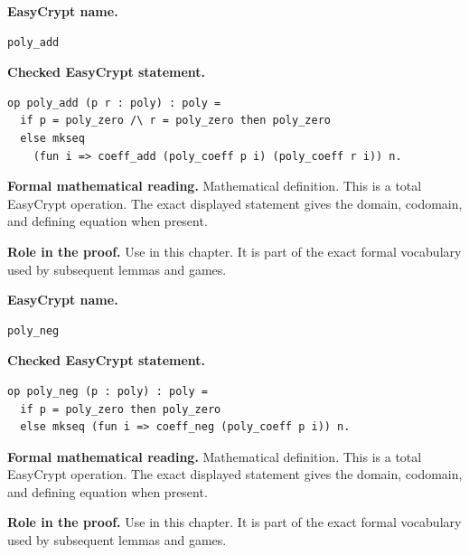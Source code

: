 \begin{formaldefinition}
\noindent\textbf{EasyCrypt name.}
\begin{lstlisting}[language=EasyCrypt,basicstyle=\ttfamily\scriptsize]
poly_add
\end{lstlisting}
\noindent\textbf{Checked EasyCrypt statement.}
\begin{lstlisting}[language=EasyCrypt,basicstyle=\ttfamily\scriptsize]
op poly_add (p r : poly) : poly =
  if p = poly_zero /\ r = poly_zero then poly_zero
  else mkseq
    (fun i => coeff_add (poly_coeff p i) (poly_coeff r i)) n.
\end{lstlisting}
\noindent\textbf{Formal mathematical reading.}
Mathematical definition. This is a total EasyCrypt operation.  The exact displayed statement gives the domain, codomain, and defining equation when present.

\noindent\textbf{Role in the proof.}
Use in this chapter. It is part of the exact formal vocabulary used by subsequent lemmas and games.

\end{formaldefinition}

\begin{formaldefinition}
\noindent\textbf{EasyCrypt name.}
\begin{lstlisting}[language=EasyCrypt,basicstyle=\ttfamily\scriptsize]
poly_neg
\end{lstlisting}
\noindent\textbf{Checked EasyCrypt statement.}
\begin{lstlisting}[language=EasyCrypt,basicstyle=\ttfamily\scriptsize]
op poly_neg (p : poly) : poly =
  if p = poly_zero then poly_zero
  else mkseq (fun i => coeff_neg (poly_coeff p i)) n.
\end{lstlisting}
\noindent\textbf{Formal mathematical reading.}
Mathematical definition. This is a total EasyCrypt operation.  The exact displayed statement gives the domain, codomain, and defining equation when present.

\noindent\textbf{Role in the proof.}
Use in this chapter. It is part of the exact formal vocabulary used by subsequent lemmas and games.

\end{formaldefinition}

